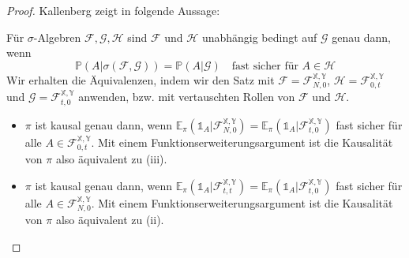 \begin{proof}
Kallenberg zeigt in \cite[Satz 8.9]{kallenberg} folgende Aussage:

Für $\sigma$-Algebren $\mathcal{F,G,H}$ sind $\mathcal{F}$ und $\mathcal{H}$ unabhängig bedingt auf $\mathcal{G}$ genau dann, wenn 
$$\mathbb{P}(A \vert \sigma(\mathcal{F}, \mathcal{G})) = \mathbb{P}(A \vert \mathcal{G}) \quad \text{fast sicher für } A \in \mathcal{H}$$
Wir erhalten die Äquivalenzen, indem wir den Satz mit $\mathcal{F}=\mathcal{F}_{N,0}^\mathbb{X,Y}$, $\mathcal{H}=\mathcal{F}_{0,t}^\mathbb{X,Y}$ und $\mathcal{G}=\mathcal{F}_{t,0}^\mathbb{X,Y}$ anwenden, bzw. mit vertauschten Rollen von $\mathcal{F}$ und $\mathcal{H}$.
\begin{itemize}
    \item $\pi$ ist kausal genau dann, wenn $\mathbb{E}_\pi(\mathds{1}_A \vert \mathcal{F}_{N,0}^\mathbb{X,Y}) = \mathbb{E}_\pi(\mathds{1}_A \vert \mathcal{F}_{t,0}^\mathbb{X,Y})$ fast sicher für alle $A \in \mathcal{F}_{0,t}^\mathbb{X,Y}$. Mit einem Funktionserweiterungsargument ist die Kausalität von $\pi$ also äquivalent zu (iii).
    \item $\pi$ ist kausal genau dann, wenn $\mathbb{E}_\pi(\mathds{1}_A \vert \mathcal{F}_{t,t}^\mathbb{X,Y}) = \mathbb{E}_\pi(\mathds{1}_A \vert \mathcal{F}_{t,0}^\mathbb{X,Y})$ fast sicher für alle $A \in \mathcal{F}_{N,0}^\mathbb{X,Y}$. Mit einem Funktionserweiterungsargument ist die Kausalität von $\pi$ also äquivalent zu (ii).
\end{itemize}
\end{proof}